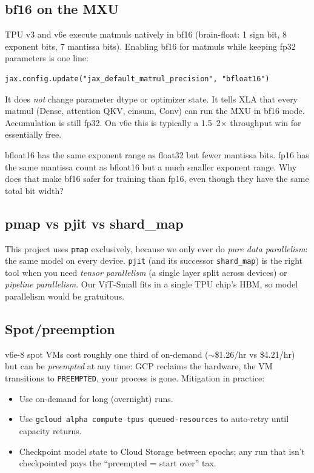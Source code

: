 \documentclass[11pt,a4paper]{article}
\newcounter{exercise}[section]
\newcommand{\answerspace}[1][3]{\vspace{#1\baselineskip}}
\newcommand{\stars}[1]{\textbf{\small(#1)}}
\begin{document}
\subsection{bf16 on the MXU}

TPU v3 and v6e execute matmuls natively in bf16 (brain-float: 1 sign bit, 8 exponent bits,
7 mantissa bits). Enabling bf16 for matmuls while keeping fp32 parameters is one line:

\begin{lstlisting}[style=py]
jax.config.update("jax_default_matmul_precision", "bfloat16")
\end{lstlisting}

\begin{keypoint}
It does \emph{not} change parameter dtype or optimizer state. It tells XLA that every matmul
(Dense, attention QKV, einsum, Conv) can run the MXU in bf16 mode. Accumulation is still fp32.
On v6e this is typically a 1.5--2$\times$ throughput win for essentially free.
\end{keypoint}

\begin{exercise}[bf16 vs fp16, \stars{2}]
bfloat16 has the same exponent range as float32 but fewer mantissa bits. fp16 has the same
mantissa count as bfloat16 but a much smaller exponent range. Why does that make bf16 safer
for training than fp16, even though they have the same total bit width?
\answerspace[3]
\end{exercise}

\subsection{pmap vs pjit vs shard\_map}

This project uses \texttt{pmap} exclusively, because we only ever do \emph{pure data
parallelism}: the same model on every device. \texttt{pjit} (and its successor
\texttt{shard\_map}) is the right tool when you need \emph{tensor parallelism} (a single
layer split across devices) or \emph{pipeline parallelism}. Our ViT-Small fits in a single
TPU chip's HBM, so model parallelism would be gratuitous.

\subsection{Spot/preemption}

v6e-8 spot VMs cost roughly one third of on-demand ($\sim$\$1.26/hr vs \$4.21/hr) but can be
\emph{preempted} at any time: GCP reclaims the hardware, the VM transitions to
\texttt{PREEMPTED}, your process is gone. Mitigation in practice:
\begin{itemize}
    \item Use on-demand for long (overnight) runs.
    \item Use \texttt{gcloud alpha compute tpus queued-resources} to auto-retry until
          capacity returns.
    \item Checkpoint model state to Cloud Storage between epochs; any run that isn't
          checkpointed pays the ``preempted = start over'' tax.
\end{itemize}
\end{document}
